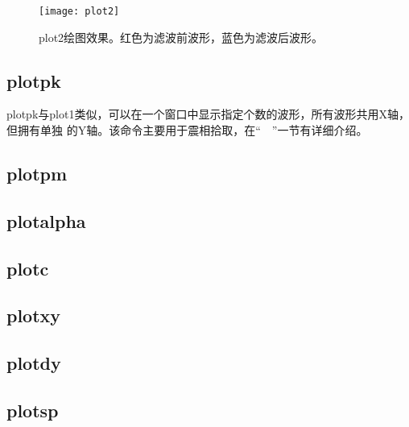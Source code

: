 \begin{figure}[H]
\centering
\texttt{[image: plot2]}
\caption[plot2绘图效果]{plot2绘图效果。红色为滤波前波形，蓝色为滤波后波形。}
\label{fig:plot2}
\end{figure}

\subsection{plotpk}
plotpk与plot1类似，可以在一个窗口中显示指定个数的波形，所有波形共用X轴，但拥有单独
的Y轴。该命令主要用于震相拾取，在``~~''一节有详细介绍。

\subsection{plotpm}

\subsection{plotalpha}
\subsection{plotc}
\subsection{plotxy}
\subsection{plotdy}
\subsection{plotsp}
